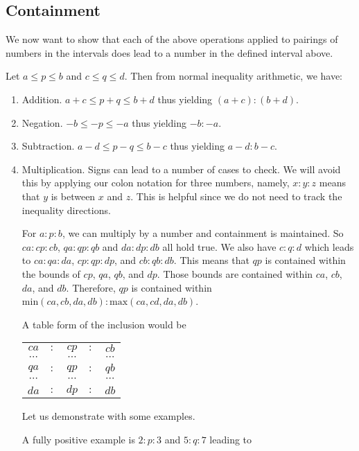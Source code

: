 \documentclass[12pt]{article}
\begin{document}
\subsection{Containment}\label{containment}

We now want to show that each of the above operations applied to pairings of numbers in the intervals  does lead to a number in the defined interval above. 

Let $a \leq p \leq b$ and $c\leq  q \leq  d$. Then from normal inequality arithmetic, we have: 

\begin{enumerate}
    \item Addition.   $a +c \leq  p + q \leq  b +d$ thus yielding $(a+c):(b+d)$.
    \item Negation.  $-b \leq -p \leq -a$ thus yielding $-b:-a$.
    \item Subtraction.  $a - d \leq p-q \leq b -c$  thus yielding $a-d:b-c$.
    \item Multiplication. Signs can lead to a number of cases to check. We will avoid this by  applying our colon notation for three numbers, namely,  $x:y:z$ means that $y$ is between $x$ and $z$. This is helpful since we do not need to track the inequality directions. 
    
    For $a:p:b$, we can multiply by a number and containment is maintained. So $ca:cp:cb$, $qa: qp: qb$ and $da:dp:db$ all hold true. We also have $c:q:d$ which leads to $ca:qa:da$, $cp:qp:dp$, and $cb:qb:db$. This means that $qp$ is contained within the bounds of $cp$, $qa$, $qb$, and $dp$. Those bounds are contained within $ca$, $cb$, $da$, and $db$. Therefore, $qp$ is contained within $\mathrm{min}(ca, cb, da, db):\mathrm{max}(ca, cd, da, db)$. 
    
    A table form of the inclusion would be 
    
    \begin{tabular}{ccccc}
        $ca$ &$:$& $cp$ &$:$& $cb$ \\
        $\cdots$ & & $\cdots$ & & $\cdots$ \\
        $qa$ &$:$& $qp$ &$:$& $qb$\\
        $\cdots$ & & $\cdots$ & & $\cdots$ \\
         $da$ &$:$& $dp$&$:$& $db$
    \end{tabular}
    
    Let us demonstrate with some examples. 
    
    A fully positive example is $2:p:3$ and $5:q:7$ leading to 
    

\end{enumerate}
\end{document}
